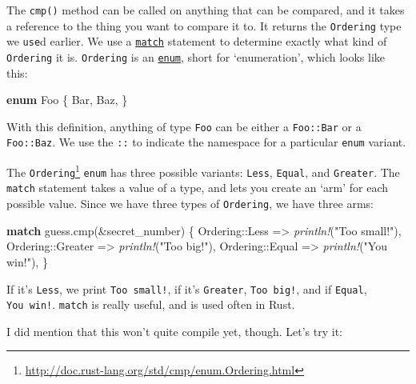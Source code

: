 \documentclass[a4paper,]{book}
\newenvironment{Shaded}{\begin{snugshade}}{\end{snugshade}}
\newcommand{\KeywordTok}[1]{\textcolor[rgb]{0.13,0.29,0.53}{\textbf{{#1}}}}
\newcommand{\StringTok}[1]{\textcolor[rgb]{0.31,0.60,0.02}{{#1}}}
\newcommand{\PreprocessorTok}[1]{\textcolor[rgb]{0.56,0.35,0.01}{\textit{{#1}}}}
\newcommand{\NormalTok}[1]{{#1}}
\renewcommand{\href}[2]{#2\footnote{\url{#1}}}
\begin{document}
The \texttt{cmp()} method can be called on anything that can be
compared, and it takes a reference to the thing you want to compare it
to. It returns the \texttt{Ordering} type we \texttt{use}d earlier. We
use a \protect\hyperlink{sec--match}{\texttt{match}} statement to
determine exactly what kind of \texttt{Ordering} it is.
\texttt{Ordering} is an \protect\hyperlink{sec--enums}{\texttt{enum}},
short for `enumeration', which looks like this:

\begin{Shaded}
\begin{Highlighting}[]
\KeywordTok{enum} \NormalTok{Foo \{}
    \NormalTok{Bar,}
    \NormalTok{Baz,}
\NormalTok{\}}
\end{Highlighting}
\end{Shaded}

With this definition, anything of type \texttt{Foo} can be either a
\texttt{Foo::Bar} or a \texttt{Foo::Baz}. We use the \texttt{::} to
indicate the namespace for a particular \texttt{enum} variant.

The
\href{http://doc.rust-lang.org/std/cmp/enum.Ordering.html}{\texttt{Ordering}}
\texttt{enum} has three possible variants: \texttt{Less},
\texttt{Equal}, and \texttt{Greater}. The \texttt{match} statement takes
a value of a type, and lets you create an `arm' for each possible value.
Since we have three types of \texttt{Ordering}, we have three arms:

\begin{Shaded}
\begin{Highlighting}[]
\KeywordTok{match} \NormalTok{guess.cmp(&secret_number) \{}
    \NormalTok{Ordering::Less    => }\PreprocessorTok{println!}\NormalTok{(}\StringTok{"Too small!"}\NormalTok{),}
    \NormalTok{Ordering::Greater => }\PreprocessorTok{println!}\NormalTok{(}\StringTok{"Too big!"}\NormalTok{),}
    \NormalTok{Ordering::Equal   => }\PreprocessorTok{println!}\NormalTok{(}\StringTok{"You win!"}\NormalTok{),}
\NormalTok{\}}
\end{Highlighting}
\end{Shaded}

If it's \texttt{Less}, we print \texttt{Too\ small!}, if it's
\texttt{Greater}, \texttt{Too\ big!}, and if \texttt{Equal},
\texttt{You\ win!}. \texttt{match} is really useful, and is used often
in Rust.

I did mention that this won't quite compile yet, though. Let's try it:
\end{document}
